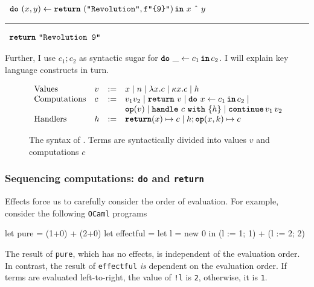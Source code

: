 \begin{eff}
$\begin{array}{l}\bind{(x, y)}{\return{(\texttt{"Revolution"}, \texttt{f"\{9\}"})}}{\, x \text{ \^\ } y}\end{array}$
\vspace{2mm} 
\textcolor{effComment}{\hrule height 0.2mm \relax}
\vspace{2mm} 

\textcolor{effComment}{$\begin{array}{l}\texttt{\textbf{return}} \,\, {\texttt{"Revolution 9"}}\end{array}$}
\end{eff}
Further, I use $c_1;c_2$ as syntactic sugar for $\texttt{\textbf{do}} \,\, {\_} \leftarrow {c_1} \, \textbf{\texttt{in}} \, {c_2}$. 
I will explain key language constructs in turn.
\begin{figure}[t]
  \begin{eff-desc}

  $\begin{array}{llll}
  \text{Values} & v & := & x \mid n \mid \lambda x. c \mid \kappa x.c \mid h \\

  \text{Computations} & c & := & v_1 v_2 \mid \return{v} \mid \bind{x}{c_1}{c_2} \mid \\
                             &&& \op{v} \mid \handleWith{c}{h} \mid \continue{v_1}{v_2} \\ 
  \text{Handlers} & h & := &\returnHandler{x}{c} \mid h;\opHandler{x}{k}{c}
  \end{array}$
  
  \end{eff-desc}
  \caption{The syntax of \efflang. Terms are syntactically divided into values $v$ and computations $c$ }
  \label{fig:eff-lang-syntax}
\end{figure}

\subsubsection{Sequencing computations: \texttt{do} and \texttt{return}}
Effects force us to carefully consider the order of evaluation. For example, consider the following \texttt{OCaml} programs
\begin{ocaml}
let pure      = (1+0) + (2+0)
let effectful = let l = new 0 in (l := 1; 1) + (l := 2; 2)
\end{ocaml}
The result of \texttt{pure}, which has no effects, is independent of the evaluation order. In contrast, the result of \texttt{effectful} \textit{is} dependent on the evaluation order. If terms are evaluated left-to-right, the value of \texttt{!l} is \texttt{2}, otherwise, it is \texttt{1}.

